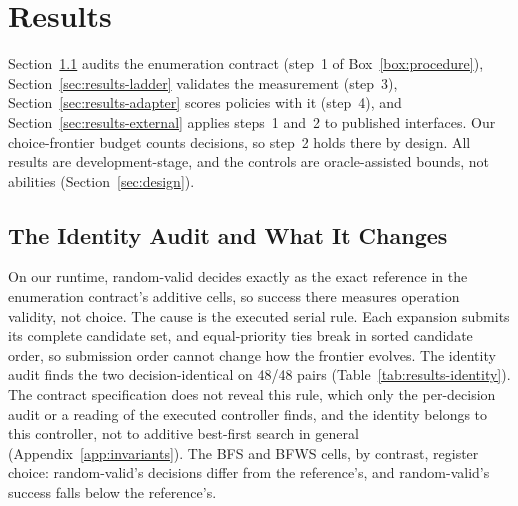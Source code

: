 \section{Results}
\label{sec:results}

Section~\ref{sec:results-identity} audits the enumeration contract (step~1 of Box~\ref{box:procedure}), Section~\ref{sec:results-ladder} validates the measurement (step~3), Section~\ref{sec:results-adapter} scores policies with it (step~4), and Section~\ref{sec:results-external} applies steps~1 and~2 to published interfaces. Our choice-frontier budget counts decisions, so step~2 holds there by design. All results are development-stage, and the controls are oracle-assisted bounds, not abilities (Section~\ref{sec:design}).

\subsection{The Identity Audit and What It Changes}
\label{sec:results-identity}

On our runtime, random-valid decides exactly as the exact reference in the enumeration contract's additive cells, so success there measures operation validity, not choice. The cause is the executed serial rule. Each expansion submits its complete candidate set, and equal-priority ties break in sorted candidate order, so submission order cannot change how the frontier evolves. The identity audit finds the two decision-identical on 48/48 pairs (Table~\ref{tab:results-identity}). The contract specification does not reveal this rule, which only the per-decision audit or a reading of the executed controller finds, and the identity belongs to this controller, not to additive best-first search in general (Appendix~\ref{app:invariants}). The BFS and BFWS cells, by contrast, register choice: random-valid's decisions differ from the reference's, and random-valid's success falls below the reference's.

